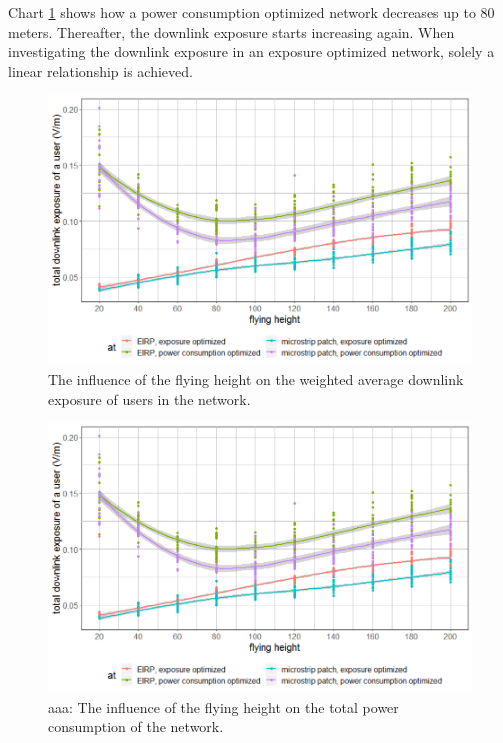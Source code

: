 Chart \ref{fig:s3fhvsdl} shows how a power consumption optimized network decreases up to 80 meters. Thereafter, 
the downlink exposure starts increasing again. When investigating the downlink exposure in an exposure 
optimized network, solely a linear relationship is achieved. 


\begin{figure}[]
  \includegraphics[width=\textwidth]{../results/s3/fhvsdl.png}
  \caption{The influence of the flying height on the weighted average downlink exposure of users in the network.}
  \label{fig:s3fhvsdl}
\end{figure}

\begin{figure}[]
  \includegraphics[width=\textwidth]{../results/s3/fhvsdl.png}
  \caption{aaa: The influence of the flying height on the total power consumption of the network.}
  \label{fig:s3fhvspc}
\end{figure}

